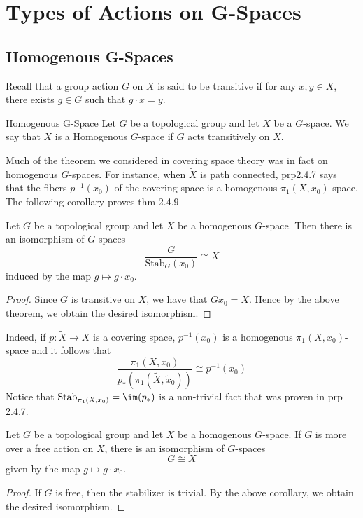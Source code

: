\documentclass[a4paper]{article}
\begin{document}
\pagebreak
\section{Types of Actions on G-Spaces}
\subsection{Homogenous G-Spaces}
Recall that a group action $G$ on $X$ is said to be transitive if for any $x,y\in X$, there exists $g\in G$ such that $g\cdot x=y$. 

\begin{defn}{Homogenous G-Space}{} Let $G$ be a topological group and let $X$ be a $G$-space. We say that $X$ is a Homogenous $G$-space if $G$ acts transitively on $X$. 
\end{defn}

Much of the theorem we considered in covering space theory was in fact on homogenous $G$-spaces. For instance, when $\tilde{X}$ is path connected, prp2.4.7 says that the fibers $p^{-1}(x_0)$ of the covering space is a homogenous $\pi_1(X,x_0)$-space. The following corollary proves thm 2.4.9

\begin{crl}{}{} Let $G$ be a topological group and let $X$ be a homogenous $G$-space. Then there is an isomorphism of $G$-spaces $$\frac{G}{\text{Stab}_G(x_0)}\cong X$$ induced by the map $g\mapsto g\cdot x_0$. \tcbline
\begin{proof}
Since $G$ is transitive on $X$, we have that $Gx_0=X$. Hence by the above theorem, we obtain the desired isomorphism. 
\end{proof}
\end{crl}

Indeed, if $p:\tilde{X}\to X$ is a covering space, $p^{-1}(x_0)$ is a homogenous $\pi_1(X,x_0)$-space and it follows that $$\frac{\pi_1(X,x_0)}{p_\ast(\pi_1(\tilde{X},\tilde{x}_0))}\cong p^{-1}(x_0)$$ Notice that $\text{Stab}_{\pi_1(X,x_0)}=\im(p_\ast)$ is a non-trivial fact that was proven in prp 2.4.7. 

\begin{crl}{}{} Let $G$ be a topological group and let $X$ be a homogenous $G$-space. If $G$ is more over a free action on $X$, there is an isomorphism of $G$-spaces $$G\cong X$$ given by the map $g\mapsto g\cdot x_0$. \tcbline
\begin{proof}
If $G$ is free, then the stabilizer is trivial. By the above corollary, we obtain the desired isomorphism. 
\end{proof}
\end{crl}
\end{document}

